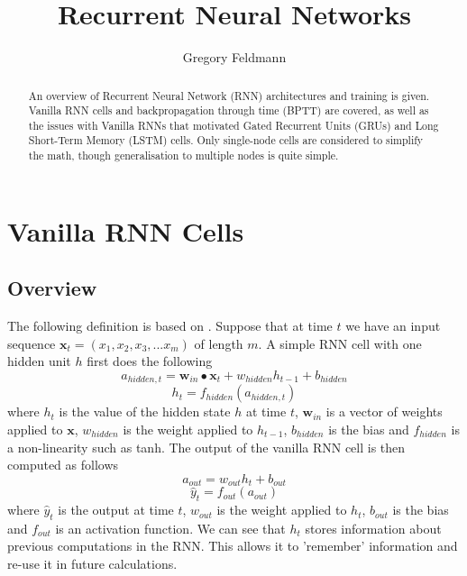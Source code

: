 \documentclass[]{article}
\title{Recurrent Neural Networks}
\author{Gregory Feldmann}
\begin{document}
\maketitle

\begin{abstract}
An overview of Recurrent Neural Network (RNN) architectures and training is given. Vanilla RNN cells and backpropagation through time (BPTT) are covered, as well as the issues with Vanilla RNNs that motivated Gated Recurrent Units (GRUs) and Long Short-Term Memory (LSTM) cells. Only single-node cells are considered to simplify the math, though generalisation to multiple nodes is quite simple.
\end{abstract}

\section{Vanilla RNN Cells}
\subsection{Overview}
The following definition is based on \cite{bullinaria}. Suppose that at time $t$ we have an input sequence $\textbf{x}_{t} = (x_{1}, x_{2}, x_{3},...x_{m})$ of length $m$. A simple RNN cell with one hidden unit $h$ first does the following
\begin{equation}
a_{hidden, t} = \textbf{w}_{in} \bullet \textbf{x}_{t} + w_{hidden} h_{t-1} + b_{hidden}
\end{equation}
\begin{equation}
h_{t} = f_{hidden}(a_{hidden,t})
\end{equation}
where $h_{t}$ is the value of the hidden state $h$ at time $t$, $\textbf{w}_{in}$ is a vector of weights applied to $\textbf{x}$, $w_{hidden}$ is the weight applied to $h_{t-1}$, $b_{hidden}$ is the bias and $f_{hidden}$ is a non-linearity such as tanh. The output of the vanilla RNN cell is then computed as follows
\begin{equation}
a_{out} = w_{out} h_{t} + b_{out}
\end{equation}
\begin{equation}
\hat{y}_{t} = f_{out}(a_{out})
\end{equation}
where $\hat{y}_{t}$ is the output at time $t$, $w_{out}$ is the weight applied to $h_{t}$, $b_{out}$ is the bias and $f_{out}$ is an activation function.
\newline
\newline
We can see that $h_{t}$ stores information about previous computations in the RNN. This allows it to 'remember' information and re-use it in future calculations.
\end{document}
